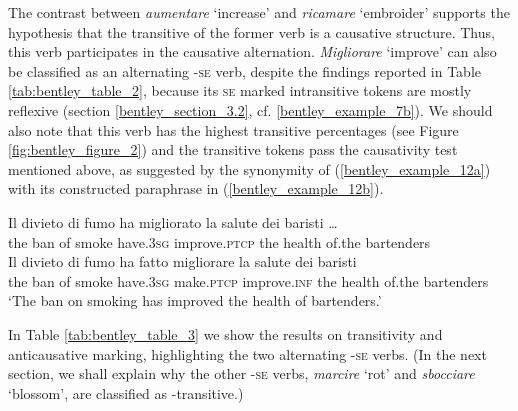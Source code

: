 \documentclass[output=paper,colorlinks,citecolor=brown
]{langscibook}
\begin{document}
The contrast between \textit{aumentare} ‘increase’ and \textit{ricamare} ‘embroider’ supports the hypothesis that the transitive of the former verb is a causative structure. Thus, this verb participates in the causative alternation. 
\textit{Migliorare} ‘improve’ can also be classified as an alternating -\textsc{se} verb, despite the findings reported in Table \ref{tab:bentley_table_2}, because its \textsc{se} marked intransitive tokens are mostly reflexive (section \ref{bentley_section_3.2}, cf. \ref{bentley_example_7b}). We should also note that this verb has the highest transitive percentages (see Figure \ref{fig:bentley_figure_2}) and the transitive tokens pass the causativity test mentioned above, as suggested by the synonymity of (\ref{bentley_example_12a}) with its constructed paraphrase in (\ref{bentley_example_12b}).

\ea \label{bentley_example_12}
    \ea \label{bentley_example_12a}
    \gll 	Il		divieto		di		fumo		ha							migliorato				la		salute		dei				baristi \ldots  \\
    						the	ban				of		smoke	have.3\textsc{sg}		improve.\textsc{ptcp}		the	health	of.the		bartenders				\\
    \ex \label{bentley_example_12b}
    \gll Il		divieto		di		fumo		ha							fatto						migliorare 	la 	salute 	dei			 baristi \\
   	the	ban				of		smoke	have.3\textsc{sg}		make.\textsc{ptcp}	improve.\textsc{inf}	the	health	of.the		bartenders \\
    \glt 					‘The ban on smoking has improved the health of bartenders.’
    \z
\z

In Table \ref{tab:bentley_table_3} we show the results on transitivity and anticausative marking, highlighting the two alternating -\textsc{se} verbs. (In the next section, we shall explain why the other -\textsc{se} verbs, \textit{marcire} ‘rot’ and \textit{sbocciare} ‘blossom’, are classified as -transitive.)
\end{document}
